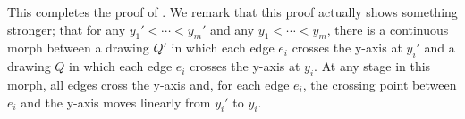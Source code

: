 \documentclass{patmorin}
\begin{document}
%
%
%
%

This completes the proof of .  We remark that this proof
actually shows something stronger; that for any $y_1'<\cdots<y_m'$ and
any $y_1<\cdots<y_m$, there is a continuous morph
between a drawing $Q'$ in which each edge $e_i$ crosses the y-axis at
$y_i'$ and a drawing $Q$ in which each edge $e_i$ crosses the y-axis
at $y_i$.  At any stage in this morph, all edges cross the y-axis and,
for each edge $e_i$, the crossing point between $e_i$ and the y-axis
moves linearly from $y_i'$ to $y_i$.
\end{document}
